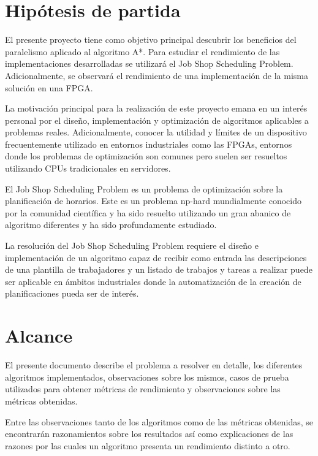 
\section{Hipótesis de partida}

El presente proyecto tiene como objetivo principal descubrir los
beneficios del paralelismo aplicado al algoritmo A*.
Para estudiar el rendimiento de las implementaciones desarrolladas
se utilizará el Job Shop Scheduling Problem.
Adicionalmente, se observará el rendimiento de una implementación
de la misma solución en una FPGA.

La motivación principal para la realización de este proyecto
emana en un interés personal por el diseño, implementación y optimización
de algoritmos aplicables a problemas reales.
Adicionalmente, conocer la utilidad y límites de un dispositivo frecuentemente utilizado
en entornos industriales como las FPGAs, entornos donde los problemas
de optimización son comunes pero suelen ser resueltos utilizando
CPUs tradicionales en servidores.

El Job Shop Scheduling Problem es un problema de optimización
sobre la planificación de horarios.
Este es un problema np-hard mundialmente conocido
por la comunidad científica y
ha sido resuelto utilizando un gran abanico de algoritmo diferentes
y ha sido profundamente estudiado.

La resolución del Job Shop Scheduling Problem requiere el diseño e implementación de
un algoritmo capaz de recibir como entrada las descripciones de una plantilla
de trabajadores y un listado de trabajos y tareas a realizar puede ser
aplicable en ámbitos industriales donde la automatización de la creación
de planificaciones pueda ser de interés.

\pagebreak

\section{Alcance}

El presente documento describe el problema a resolver en detalle,
los diferentes algoritmos implementados,
observaciones sobre los mismos,
casos de prueba utilizados para obtener métricas de rendimiento
y observaciones sobre las métricas obtenidas.

Entre las observaciones tanto de los algoritmos como de las métricas
obtenidas, se encontrarán razonamientos sobre los resultados así
como explicaciones de las razones por las cuales un algoritmo
presenta un rendimiento distinto a otro.
